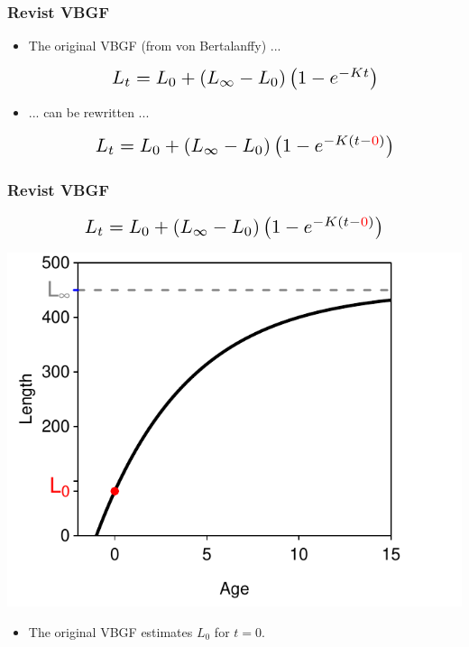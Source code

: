 \documentclass[xcolor=dvipsnames]{beamer}\usepackage[]{graphicx}\usepackage[]{color}
\makeatletter
\newenvironment{knitrout}{}{} %
\newcommand*{\Scale}[2][4]{\scalebox{#1}{\ensuremath{#2}}}%
\def\mathcolor#1#{\@mathcolor{#1}}
\def\@mathcolor#1#2#3{%
  \protect\leavevmode
  \begingroup
    \color#1{#2}#3%
  \endgroup
}
\makeatother
\begin{document}
\begin{frame}[fragile, t]
\frametitle{Revist VBGF}
\begin{itemize}
\item The original VBGF (from von Bertalanffy) ...

\[\Scale[1.5]{ L_{t} = L_{0} + (L_{\infty}-L_{0})\left(1-e^{-Kt}\right) }\]

\bigskip
\item ... can be rewritten ...

\[\Scale[1.5]{ L_{t} = L_{0} + (L_{\infty}-L_{0})\left(1-e^{-K(t-\mathcolor{red}{0})}\right) }\]
\end{itemize}
\end{frame}


\begin{frame}
\frametitle{Revist VBGF}
\vspace{-14pt}
\[\Scale[1.5]{ L_{t} = L_{0} + (L_{\infty}-L_{0})\left(1-e^{-K(t-\mathcolor{red}{0})}\right) }\]
\vspace{14pt}
\begin{knitrout}\footnotesize
{}\color{fgcolor}

{\centering \includegraphics[width=.5\linewidth]{Figs/redefineC-1} 

}



\end{knitrout}

\begin{itemize}
\item The original VBGF estimates $L_{0}$ for $t=0$.
\end{itemize}
\end{frame}
\end{document}
